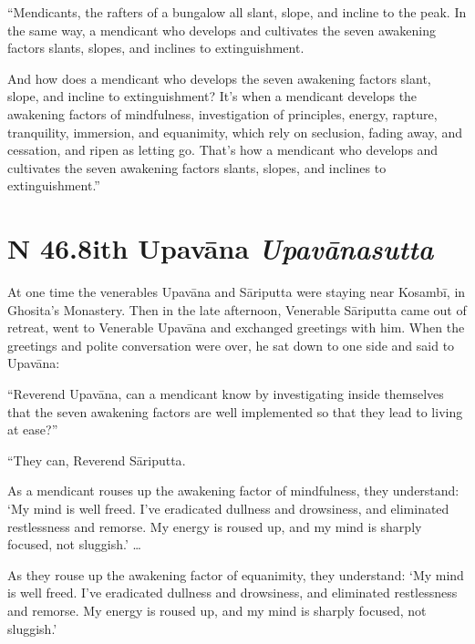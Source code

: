 \documentclass[12pt,openany]{book}%
\newcommand*{\suttatitleacronym}[1]{\smaller[2]{#1}\vspace*{.3em}}
\newcommand*{\suttatitletranslation}[1]{\linebreak{#1}}
\newcommand*{\suttatitleroot}[1]{\linebreak\smaller[2]\itshape{#1}}
\newcommand*{\tocacronym}[1]{\hspace*{-3.3em}{#1}\quad}
\newcommand*{\toctranslation}[1]{#1}
\newcommand*{\tocroot}[1]{(\textit{#1})}
\begin{document}
“Mendicants, the rafters of a bungalow all slant, slope, and incline to the peak. In the same way, a mendicant who develops and cultivates the seven awakening factors slants, slopes, and inclines to extinguishment. 

And how does a mendicant who develops the seven awakening factors slant, slope, and incline to extinguishment? It’s when a mendicant develops the awakening factors of mindfulness, investigation of principles, energy, rapture, tranquility, immersion, and equanimity, which rely on seclusion, fading away, and cessation, and ripen as letting go. That’s how a mendicant who develops and cultivates the seven awakening factors slants, slopes, and inclines to extinguishment.” 

%
\section*{{\suttatitleacronym SN 46.8}{\suttatitletranslation With Upavāna }{\suttatitleroot Upavānasutta}}
\addcontentsline{toc}{section}{\tocacronym{SN 46.8} \toctranslation{With Upavāna } \tocroot{Upavānasutta}}

At one time the venerables \textsanskrit{Upavāna} and \textsanskrit{Sāriputta} were staying near \textsanskrit{Kosambī}, in Ghosita’s Monastery. Then in the late afternoon, Venerable \textsanskrit{Sāriputta} came out of retreat, went to Venerable \textsanskrit{Upavāna} and exchanged greetings with him. When the greetings and polite conversation were over, he sat down to one side and said to \textsanskrit{Upavāna}: 

“Reverend \textsanskrit{Upavāna}, can a mendicant know by investigating inside themselves that the seven awakening factors are well implemented so that they lead to living at ease?” 

“They can, Reverend \textsanskrit{Sāriputta}. 

As a mendicant rouses up the awakening factor of mindfulness, they understand: ‘My mind is well freed. I’ve eradicated dullness and drowsiness, and eliminated restlessness and remorse. My energy is roused up, and my mind is sharply focused, not sluggish.’ … 

As they rouse up the awakening factor of equanimity, they understand: ‘My mind is well freed. I’ve eradicated dullness and drowsiness, and eliminated restlessness and remorse. My energy is roused up, and my mind is sharply focused, not sluggish.’ 
\end{document}
